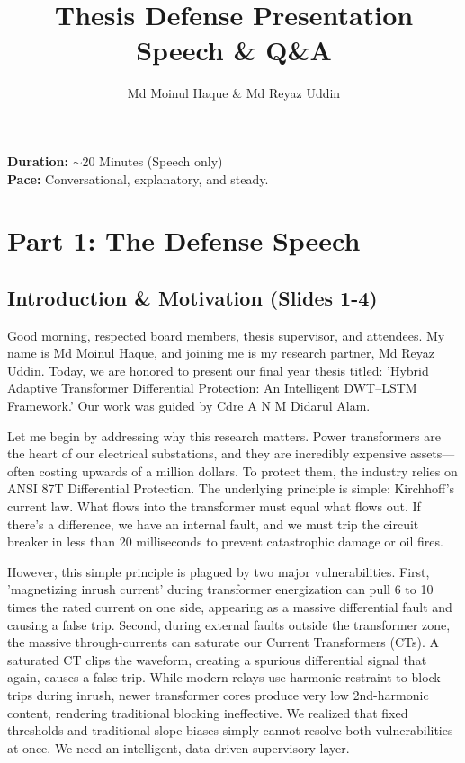 \documentclass[12pt]{article}
\title{\textbf{Thesis Defense Presentation Speech \& Q\&A}}
\author{Md Moinul Haque \& Md Reyaz Uddin}
\date{}
\begin{document}
\maketitle

\noindent\textbf{Duration:} $\sim$20 Minutes (Speech only) \\
\textbf{Pace:} Conversational, explanatory, and steady.

\section*{Part 1: The Defense Speech}

\subsection*{Introduction \& Motivation (Slides 1-4)}
Good morning, respected board members, thesis supervisor, and attendees. My name is Md Moinul Haque, and joining me is my research partner, Md Reyaz Uddin. Today, we are honored to present our final year thesis titled: 'Hybrid Adaptive Transformer Differential Protection: An Intelligent DWT–LSTM Framework.' Our work was guided by Cdre A N M Didarul Alam.

Let me begin by addressing why this research matters. Power transformers are the heart of our electrical substations, and they are incredibly expensive assets—often costing upwards of a million dollars. To protect them, the industry relies on ANSI 87T Differential Protection. The underlying principle is simple: Kirchhoff's current law. What flows into the transformer must equal what flows out. If there's a difference, we have an internal fault, and we must trip the circuit breaker in less than 20 milliseconds to prevent catastrophic damage or oil fires.

However, this simple principle is plagued by two major vulnerabilities. First, 'magnetizing inrush current' during transformer energization can pull 6 to 10 times the rated current on one side, appearing as a massive differential fault and causing a false trip. Second, during external faults outside the transformer zone, the massive through-currents can saturate our Current Transformers (CTs). A saturated CT clips the waveform, creating a spurious differential signal that again, causes a false trip. While modern relays use harmonic restraint to block trips during inrush, newer transformer cores produce very low 2nd-harmonic content, rendering traditional blocking ineffective. We realized that fixed thresholds and traditional slope biases simply cannot resolve both vulnerabilities at once. We need an intelligent, data-driven supervisory layer.
\end{document}

